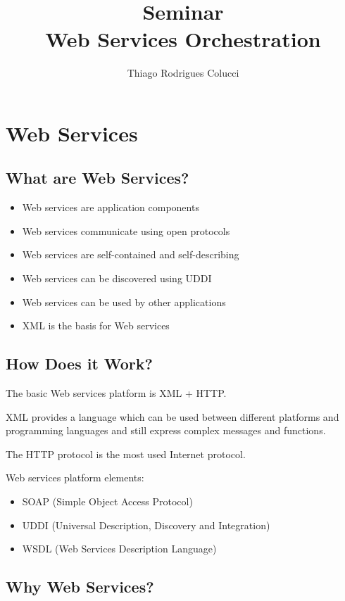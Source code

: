 \documentclass[12pt,a4paper]{article}
\title{Seminar\\Web Services Orchestration}
\author{Thiago Rodrigues Colucci}
\begin{document}
\maketitle

\newpage

\tableofcontents

\newpage


\section{Web Services}
\subsection{What are Web Services?}
\begin{itemize}
\item Web services are application components
\item Web services communicate using open protocols
\item Web services are self-contained and self-describing
\item Web services can be discovered using UDDI
\item Web services can be used by other applications
\item XML is the basis for Web services
\end{itemize}

\subsection{How Does it Work?}
The basic Web services platform is XML + HTTP.

XML provides a language which can be used between different platforms and programming languages and still express complex messages and functions.

The HTTP protocol is the most used Internet protocol.

Web services platform elements:
\begin{itemize}
\item SOAP (Simple Object Access Protocol)
\item UDDI (Universal Description, Discovery and Integration)
\item WSDL (Web Services Description Language)
\end{itemize}

\subsection{Why Web Services?}
\end{document}
